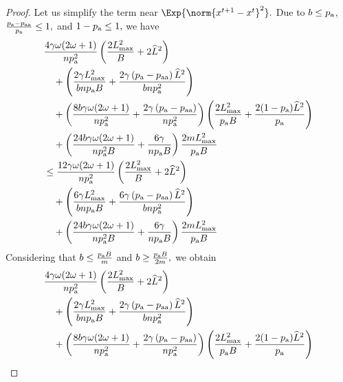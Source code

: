 \documentclass{article}
\newcommand*{\probavailable}{\ensuremath{p_{\textnormal{a}}}}
\newcommand*{\probpairaa}{\ensuremath{p_{\textnormal{aa}}}}
\begin{document}
\begin{proof}
    Let us simplify the term near $\Exp{\norm{x^{t+1} - x^t}^2}.$ Due to $b \leq \probavailable$, $\frac{\probavailable - \probpairaa}{\probavailable} \leq 1,$ and $1 - \probavailable \leq 1,$ 
    we have 
    \begin{align*}
      &\frac{4 \gamma \omega (2 \omega + 1)}{n \probavailable^2} \left(\frac{2 L_{\max}^2}{B} + 2 \widehat{L}^2\right) \\
      &\quad + \left(\frac{2 \gamma L_{\max}^2}{b n \probavailable B} + \frac{2 \gamma \left(\probavailable - \probpairaa\right) \widehat{L}^2}{b n \probavailable^2}\right) \\
      &\quad + \left(\frac{8 b \gamma \omega (2 \omega + 1)}{n \probavailable^2} + \frac{2 \gamma \left(\probavailable - \probpairaa\right)}{n \probavailable^2}\right) \left(\frac{2 L_{\max}^2}{\probavailable B} +\frac{2(1 - \probavailable) \widehat{L}^2}{\probavailable}\right) \\
      &\quad + \left(\frac{24 b \gamma \omega (2 \omega + 1)}{n \probavailable^2 B} + \frac{6 \gamma }{n \probavailable B}\right) \frac{2 m L_{\max}^2}{\probavailable B} \\
      &\leq \frac{12 \gamma \omega (2 \omega + 1)}{n \probavailable^2} \left(\frac{2 L_{\max}^2}{B} + 2 \widehat{L}^2\right) \\
      &\quad + \left(\frac{6 \gamma L_{\max}^2}{b n \probavailable B} + \frac{6 \gamma \left(\probavailable - \probpairaa\right) \widehat{L}^2}{b n \probavailable^2}\right) \\
      &\quad + \left(\frac{24 b \gamma \omega (2 \omega + 1)}{n \probavailable^2 B} + \frac{6 \gamma }{n \probavailable B}\right) \frac{2 m L_{\max}^2}{\probavailable B}
    \end{align*}
    Considering that $b \leq \frac{\probavailable B}{m}$ and $b \geq \frac{\probavailable B}{2 m},$ we obtain
    \begin{align*}
      &\frac{4 \gamma \omega (2 \omega + 1)}{n \probavailable^2} \left(\frac{2 L_{\max}^2}{B} + 2 \widehat{L}^2\right) \\
      &\quad + \left(\frac{2 \gamma L_{\max}^2}{b n \probavailable B} + \frac{2 \gamma \left(\probavailable - \probpairaa\right) \widehat{L}^2}{b n \probavailable^2}\right) \\
      &\quad + \left(\frac{8 b \gamma \omega (2 \omega + 1)}{n \probavailable^2} + \frac{2 \gamma \left(\probavailable - \probpairaa\right)}{n \probavailable^2}\right) \left(\frac{2 L_{\max}^2}{\probavailable B} +\frac{2(1 - \probavailable) \widehat{L}^2}{\probavailable}\right) \\

\end{align*}
\end{proof}
\end{document}
